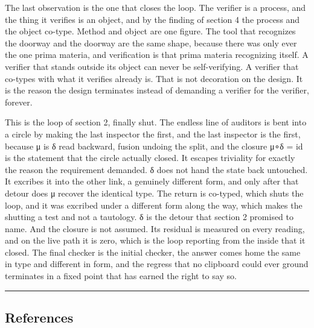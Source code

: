 The last observation is the one that closes the loop. The verifier is a
process, and the thing it verifies is an object, and by the finding of
section 4 the process and the object co-type. Method and object are one
figure. The tool that recognizes the doorway and the doorway are the
same shape, because there was only ever the one prima materia, and
verification is that prima materia recognizing itself. A verifier that
stands outside its object can never be self-verifying. A verifier that
co-types with what it verifies already is. That is not decoration on the
design. It is the reason the design terminates instead of demanding a
verifier for the verifier, forever.

This is the loop of section 2, finally shut. The endless line of
auditors is bent into a circle by making the last inspector the first,
and the last inspector is the first, because μ is δ read backward,
fusion undoing the split, and the closure μ∘δ = id is the statement that
the circle actually closed. It escapes triviality for exactly the reason
the requirement demanded. δ does not hand the state back untouched. It
excribes it into the other link, a genuinely different form, and only
after that detour does μ recover the identical type. The return is
co-typed, which shuts the loop, and it was excribed under a different
form along the way, which makes the shutting a test and not a tautology.
δ is the detour that section 2 promised to name. And the closure is not
assumed. Its residual is measured on every reading, and on the live path
it is zero, which is the loop reporting from the inside that it closed.
The final checker is the initial checker, the answer comes home the same
in type and different in form, and the regress that no clipboard could
ever ground terminates in a fixed point that has earned the right to say
so.

\begin{center}\rule{0.5\linewidth}{0.5pt}\end{center}

\hypertarget{references}{%
\subsection{References}\label{references}}

